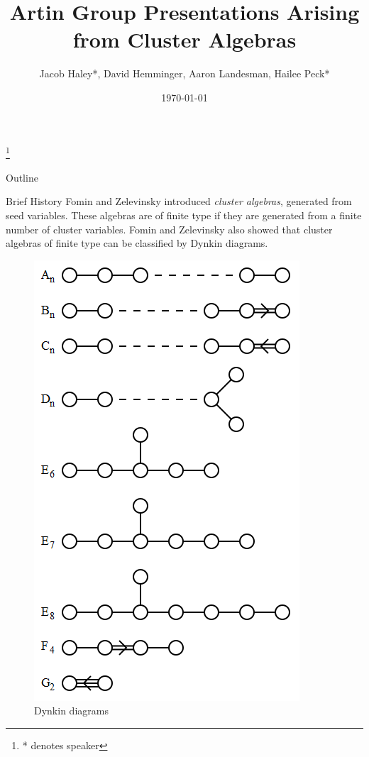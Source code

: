 \documentclass{beamer}
\title[Artin Group Presentations]{Artin Group Presentations Arising from Cluster Algebras}
\author{Jacob Haley*, David Hemminger, Aaron Landesman, 
Hailee Peck*}
\institute{University of Minnesota, Twin Cities REU}
\date{\today}
\begin{document}
\begin{frame}
  \titlepage
  \let\thefootnote\relax\footnote{* denotes speaker}
\end{frame}

 
\begin{frame}{Outline}
  \tableofcontents
\end{frame}

\begin{frame}{Brief History}
Fomin and Zelevinsky introduced \textit{cluster algebras}, generated from seed variables. These algebras are of finite type if they are generated from a finite number of cluster variables. Fomin and Zelevinsky also showed that cluster algebras of finite type can be classified by Dynkin diagrams.
\begin{figure}
\centering
\includegraphics[scale = .25]{dynkindiagrams.PNG}
\caption{Dynkin diagrams}
\end{figure}
\end{frame}
\end{document}
